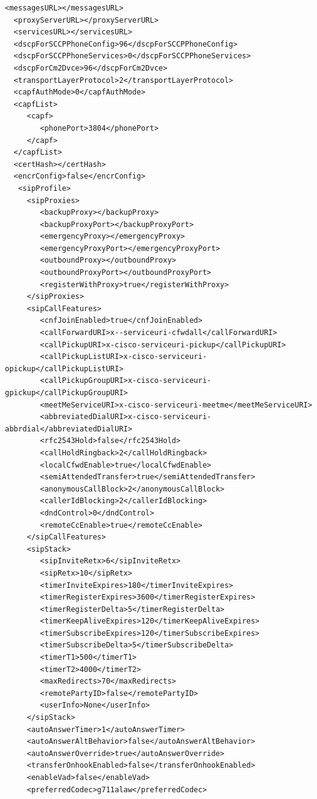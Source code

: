 \documentclass[a4paper,12pt]{scrbook}
\begin{document}
\begin{lstlisting}[caption={SEP\textbf{0012345678DE}.cnf.xml}, label=lst:cisco7961sep0012345678decnfxml]
  <messagesURL></messagesURL>
  <proxyServerURL></proxyServerURL>
  <servicesURL></servicesURL>
  <dscpForSCCPPhoneConfig>96</dscpForSCCPPhoneConfig>
  <dscpForSCCPPhoneServices>0</dscpForSCCPPhoneServices>
  <dscpForCm2Dvce>96</dscpForCm2Dvce>
  <transportLayerProtocol>2</transportLayerProtocol>
  <capfAuthMode>0</capfAuthMode>
  <capfList>
     <capf>
        <phonePort>3804</phonePort>
     </capf>
  </capfList>
  <certHash></certHash>
  <encrConfig>false</encrConfig>
   <sipProfile>
     <sipProxies>
        <backupProxy></backupProxy>
        <backupProxyPort></backupProxyPort>
        <emergencyProxy></emergencyProxy>
        <emergencyProxyPort></emergencyProxyPort>
        <outboundProxy></outboundProxy>
        <outboundProxyPort></outboundProxyPort>
        <registerWithProxy>true</registerWithProxy>
     </sipProxies>
     <sipCallFeatures>
        <cnfJoinEnabled>true</cnfJoinEnabled>
        <callForwardURI>x--serviceuri-cfwdall</callForwardURI>
        <callPickupURI>x-cisco-serviceuri-pickup</callPickupURI>
        <callPickupListURI>x-cisco-serviceuri-opickup</callPickupListURI>
        <callPickupGroupURI>x-cisco-serviceuri-gpickup</callPickupGroupURI>
        <meetMeServiceURI>x-cisco-serviceuri-meetme</meetMeServiceURI>
        <abbreviatedDialURI>x-cisco-serviceuri-abbrdial</abbreviatedDialURI>
        <rfc2543Hold>false</rfc2543Hold>
        <callHoldRingback>2</callHoldRingback>
        <localCfwdEnable>true</localCfwdEnable>
        <semiAttendedTransfer>true</semiAttendedTransfer>
        <anonymousCallBlock>2</anonymousCallBlock>
        <callerIdBlocking>2</callerIdBlocking>
        <dndControl>0</dndControl>
        <remoteCcEnable>true</remoteCcEnable>
     </sipCallFeatures>
     <sipStack>
        <sipInviteRetx>6</sipInviteRetx>
        <sipRetx>10</sipRetx>
        <timerInviteExpires>180</timerInviteExpires>
        <timerRegisterExpires>3600</timerRegisterExpires>
        <timerRegisterDelta>5</timerRegisterDelta>
        <timerKeepAliveExpires>120</timerKeepAliveExpires>
        <timerSubscribeExpires>120</timerSubscribeExpires>
        <timerSubscribeDelta>5</timerSubscribeDelta>
        <timerT1>500</timerT1>
        <timerT2>4000</timerT2>
        <maxRedirects>70</maxRedirects>
        <remotePartyID>false</remotePartyID>
        <userInfo>None</userInfo>
     </sipStack>
     <autoAnswerTimer>1</autoAnswerTimer>
     <autoAnswerAltBehavior>false</autoAnswerAltBehavior>
     <autoAnswerOverride>true</autoAnswerOverride>
     <transferOnhookEnabled>false</transferOnhookEnabled>
     <enableVad>false</enableVad>
     <preferredCodec>g711alaw</preferredCodec>

\end{lstlisting}
\end{document}
